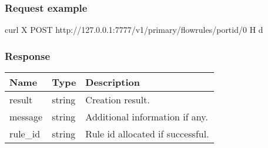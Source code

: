 \documentclass[a4paper,11pt,openany,oneside,english]{sphinxmanual}
\begin{document}
\subsubsection{Request example}
\label{\detokenize{api_ref/spp_primary:id24}}
\begin{sphinxVerbatim}[commandchars=\\\{\},formatcom=\footnotesize]
 curl \PYGZhy{}X POST http://127.0.0.1:7777/v1/primary/flow\PYGZus{}rules/port\PYGZus{}id/0 
       \PYGZhy{}H  
       \PYGZhy{}d 
\PYG{l+s+s1}{                [ \PYGZbs{}}
\PYG{l+s+s1}{                ], \PYGZbs{}}
\PYG{l+s+s1}{                [ \PYGZbs{}}
\PYG{l+s+s1}{                ] \PYGZbs{}}
\end{sphinxVerbatim}


\subsubsection{Response}
\label{\detokenize{api_ref/spp_primary:id25}}

\begin{savenotes}\sphinxattablestart
\centering
{}
\sphinxthecaptionisattop
{}\label{\detokenize{api_ref/spp_primary:id41}}\label{\detokenize{api_ref/spp_primary:table-spp-ctl-primary-flow-create}}
\sphinxaftertopcaption
\begin{tabulary}{\linewidth}[t]{|T|T|T|}
\hline
\sphinxstyletheadfamily 
Name
&\sphinxstyletheadfamily 
Type
&\sphinxstyletheadfamily 
Description
\\
\hline
result
&
string
&
Creation result.
\\
\hline
message
&
string
&
Additional information if any.
\\
\hline
rule\_id
&
string
&
Rule id allocated if successful.
\\
\hline
\end{tabulary}
\par
\sphinxattableend\end{savenotes}
\end{document}
